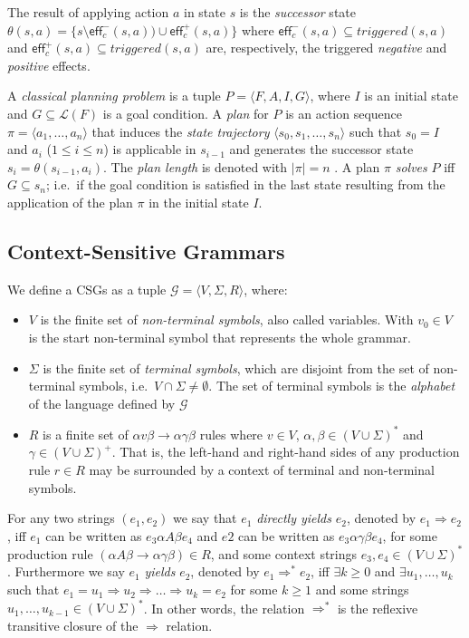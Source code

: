 \documentclass[letterpaper]{article} %
\newcommand{\tup}[1]{{\langle #1 \rangle}}
\newcommand{\eff}{\mathsf{eff}}     %
\begin{document}
The result of applying action $a$ in state $s$ is the {\em successor} state $\theta(s,a)=\{s\setminus\eff_c^-(s,a))\cup\eff_c^+(s,a)\}$ where $\eff_c^-(s,a)\subseteq triggered(s,a)$ and $\eff_c^+(s,a)\subseteq triggered(s,a)$ are, respectively, the triggered {\em negative} and {\em positive} effects.

A {\em classical planning problem} is a tuple $P=\tup{F,A,I,G}$, where $I$ is an initial state and $G\subseteq\mathcal{L}(F)$ is a goal condition. A {\em plan} for $P$ is an action sequence $\pi=\tup{a_1, \ldots, a_n}$ that induces the {\em state trajectory} $\tup{s_0, s_1, \ldots, s_n}$ such that $s_0=I$ and $a_i$ ({\small $1\leq i\leq n$}) is applicable in $s_{i-1}$ and generates the successor state $s_i=\theta(s_{i-1},a_i)$. The {\em plan length} is denoted with $|\pi|=n$ . A plan $\pi$ {\em solves} $P$ iff $G\subseteq s_n$; i.e.~if the goal condition is satisfied in the last state resulting from the application of the plan $\pi$ in the initial state $I$.

\subsection{Context-Sensitive Grammars}
We define a CSGs as a tuple $\mathcal{G}=\tup{V,\Sigma,R}$, where:
\begin{itemize}
\item $V$ is the finite set of {\em non-terminal symbols}, also called variables. With $v_0\in V$ is the start non-terminal symbol that represents the whole grammar.
\item $\Sigma$ is the finite set of {\em terminal symbols}, which are disjoint from the set of non-terminal symbols, i.e.~$V\cap \Sigma\neq\emptyset$. The set of terminal symbols is the {\em alphabet} of the language defined by $\mathcal{G}$
\item $R$ is a finite set of $\alpha v\beta\rightarrow \alpha\gamma\beta$ rules where $v\in V$, $\alpha,\beta\in(V\cup\Sigma)^*$ and $\gamma\in(V\cup\Sigma)^+$. That is, the left-hand and right-hand sides of any production rule $r\in R$ may be surrounded by a context of terminal and non-terminal symbols.
\end{itemize}

For any two strings $(e_1,e_2)$ we say that $e_1$ {\it directly yields} $e_2$, denoted by $e_1\Rightarrow e_2$, iff $e_1$ can be written as $e_3\alpha A\beta e_4$ and $e2$ can be written as $e_3\alpha \gamma\beta e_4$, for some production rule $(\alpha A\beta\rightarrow\alpha\gamma\beta)\in R$, and some context strings $e_3,e_4\in (V\cup \Sigma)^*$. Furthermore we say $e_1$ {\it yields} $e_2$, denoted by $e_1\Rightarrow^* e_2$, iff $\exists k\geq 0$ and $\exists u_1, \ldots, u_k$ such that $e_1=u_1\Rightarrow u_2\Rightarrow \ldots \Rightarrow u_k=e_2$ for some $k\geq 1$ and some strings $u_1,\ldots,u_{k-1}\in(V\cup\Sigma)^*$. In other words, the relation $\Rightarrow^*$ is the reflexive transitive closure of the $\Rightarrow$ relation.
\end{document}
